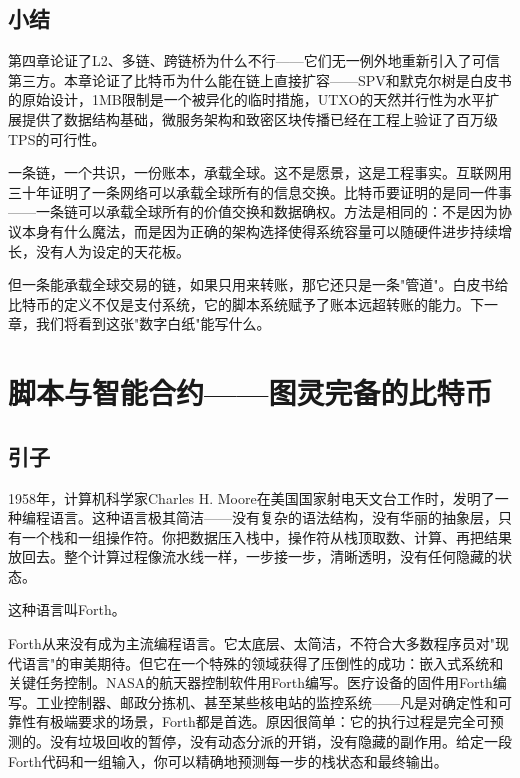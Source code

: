 \documentclass[a4paper,12pt,openany]{ctexbook}
\begin{document}
\section*{小结}


第四章论证了L2、多链、跨链桥为什么不行——它们无一例外地重新引入了可信第三方。本章论证了比特币为什么能在链上直接扩容——SPV和默克尔树是白皮书的原始设计，1MB限制是一个被异化的临时措施，UTXO的天然并行性为水平扩展提供了数据结构基础，微服务架构和致密区块传播已经在工程上验证了百万级TPS的可行性。

一条链，一个共识，一份账本，承载全球。这不是愿景，这是工程事实。互联网用三十年证明了一条网络可以承载全球所有的信息交换。比特币要证明的是同一件事——一条链可以承载全球所有的价值交换和数据确权。方法是相同的：不是因为协议本身有什么魔法，而是因为正确的架构选择使得系统容量可以随硬件进步持续增长，没有人为设定的天花板。

但一条能承载全球交易的链，如果只用来转账，那它还只是一条"管道"。白皮书给比特币的定义不仅是支付系统，它的脚本系统赋予了账本远超转账的能力。下一章，我们将看到这张"数字白纸"能写什么。



\chapter{脚本与智能合约——图灵完备的比特币}



\section*{引子}


1958年，计算机科学家Charles H. Moore在美国国家射电天文台工作时，发明了一种编程语言。这种语言极其简洁——没有复杂的语法结构，没有华丽的抽象层，只有一个栈和一组操作符。你把数据压入栈中，操作符从栈顶取数、计算、再把结果放回去。整个计算过程像流水线一样，一步接一步，清晰透明，没有任何隐藏的状态。

这种语言叫Forth。

Forth从来没有成为主流编程语言。它太底层、太简洁，不符合大多数程序员对"现代语言"的审美期待。但它在一个特殊的领域获得了压倒性的成功：嵌入式系统和关键任务控制。NASA的航天器控制软件用Forth编写。医疗设备的固件用Forth编写。工业控制器、邮政分拣机、甚至某些核电站的监控系统——凡是对确定性和可靠性有极端要求的场景，Forth都是首选。原因很简单：它的执行过程是完全可预测的。没有垃圾回收的暂停，没有动态分派的开销，没有隐藏的副作用。给定一段Forth代码和一组输入，你可以精确地预测每一步的栈状态和最终输出。
\end{document}
